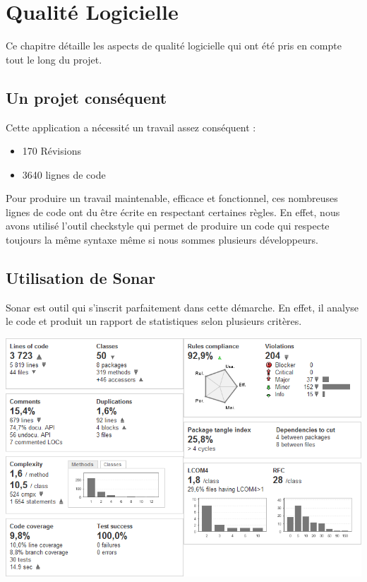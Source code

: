\chapter{Qualité Logicielle}
\minitoc

Ce chapitre détaille les aspects de qualité logicielle qui ont été pris en compte tout le long du projet.

\section{Un projet conséquent}

Cette application a nécessité un travail assez conséquent :

\begin{itemize}
\item 170 Révisions
\item 3640 lignes de code
\end{itemize}

Pour produire un travail maintenable, efficace et fonctionnel, ces nombreuses lignes de code ont du être 
écrite en respectant certaines règles. En effet, nous avons utilisé l'outil checkstyle qui permet de produire un code qui respecte toujours la même syntaxe même si nous sommes plusieurs développeurs.

\section{Utilisation de Sonar}
Sonar est outil qui s'inscrit parfaitement dans cette démarche. En effet, il analyse le code et produit un rapport de statistiques selon plusieurs critères.

\includegraphics{images/sonar-dashboard.png} 

